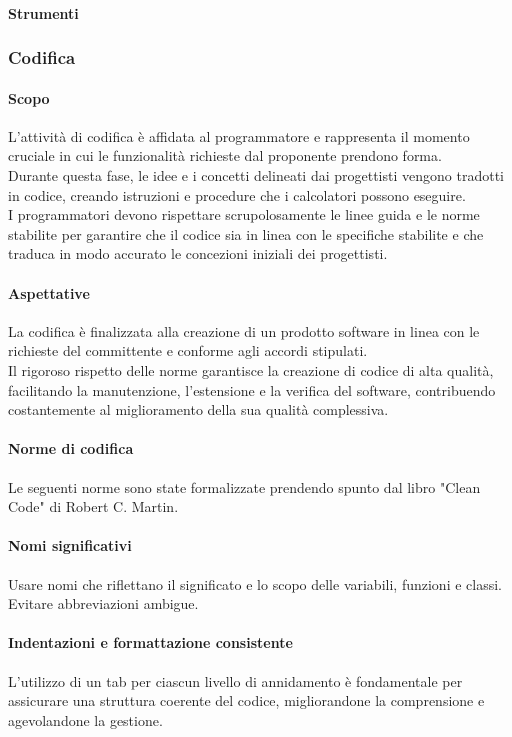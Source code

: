 \documentclass{article}
\begin{document}
\paragraph{Strumenti}

\subsubsection{Codifica}
\paragraph{Scopo}
L'attività di codifica è affidata al programmatore e rappresenta il momento cruciale in cui le funzionalità richieste dal proponente prendono forma. \\
Durante questa fase, le idee e i concetti delineati dai progettisti vengono tradotti in codice, creando istruzioni e procedure che i calcolatori possono eseguire. \\
I programmatori devono rispettare scrupolosamente le linee guida e le norme stabilite per garantire che il codice sia in linea con le specifiche stabilite e che traduca in modo accurato le concezioni iniziali dei progettisti.
\paragraph{Aspettative}
La codifica è finalizzata alla creazione di un prodotto software in linea con le richieste del committente e conforme agli accordi stipulati.\\
Il rigoroso rispetto delle norme garantisce la creazione di codice di alta qualità, facilitando la manutenzione, l'estensione e la verifica del software, contribuendo costantemente al miglioramento della sua qualità complessiva.
\paragraph{Norme di codifica}
Le seguenti norme sono state formalizzate prendendo spunto dal libro "Clean Code" di Robert C. Martin.

\paragraph*{Nomi significativi}
Usare nomi che riflettano il significato e lo scopo delle variabili, funzioni e classi. Evitare abbreviazioni ambigue.
\paragraph*{Indentazioni e formattazione consistente}
L'utilizzo di un tab per ciascun livello di annidamento è fondamentale per assicurare una struttura coerente del codice, migliorandone la comprensione e agevolandone la gestione.
\end{document}
